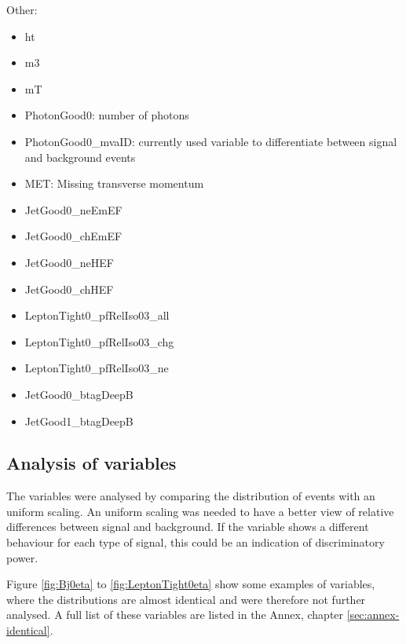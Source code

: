 \documentclass[11pt]{scrartcl}
\begin{document}
Other:
\begin{itemize}
  \item ht
  \item m3
  \item mT
  \item PhotonGood0: number of photons
  \item PhotonGood0\_mvaID: currently used variable to differentiate between signal and background events
  \item MET: Missing transverse momentum
   		\item JetGood0\_neEmEF
		\item JetGood0\_chEmEF
		\item JetGood0\_neHEF
		\item JetGood0\_chHEF
  		\item LeptonTight0\_pfRelIso03\_all
		\item LeptonTight0\_pfRelIso03\_chg
		\item LeptonTight0\_pfRelIso03\_ne
		\item JetGood0\_btagDeepB
		\item JetGood1\_btagDeepB		
\end{itemize}

	\subsection{Analysis of variables}
	
The variables were analysed by comparing the distribution of events with an uniform scaling. An uniform scaling was needed to have a better view of relative differences between signal and background. If the variable shows a different behaviour for each type of signal, this could be an indication of discriminatory power. 

Figure \ref{fig:Bj0eta} to \ref{fig:LeptonTight0eta} show some examples of variables, where the distributions are almost identical and were therefore not further analysed. A full list of these variables are listed in the Annex, chapter \ref{sec:annex-identical}. 
\end{document}
